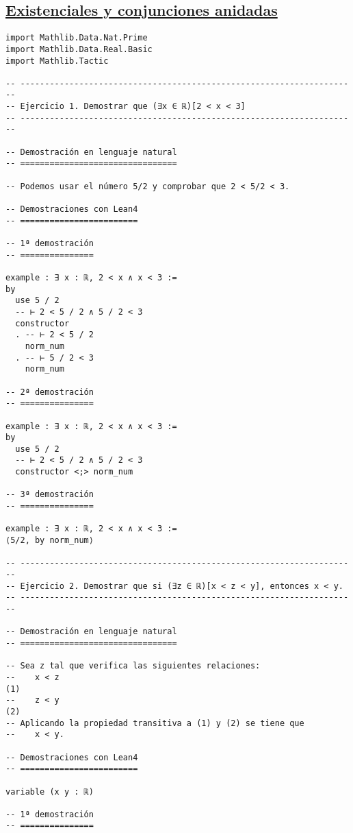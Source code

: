 \subsection{\href{./src/Logica/Existenciales\_y\_conjunciones\_anidadas.lean}{Existenciales y conjunciones anidadas}}
\label{sec:org947fbf4}
\begin{verbatim}
import Mathlib.Data.Nat.Prime
import Mathlib.Data.Real.Basic
import Mathlib.Tactic

-- ---------------------------------------------------------------------
-- Ejercicio 1. Demostrar que (∃x ∈ ℝ)[2 < x < 3]
-- ---------------------------------------------------------------------

-- Demostración en lenguaje natural
-- ================================

-- Podemos usar el número 5/2 y comprobar que 2 < 5/2 < 3.

-- Demostraciones con Lean4
-- ========================

-- 1ª demostración
-- ===============

example : ∃ x : ℝ, 2 < x ∧ x < 3 :=
by
  use 5 / 2
  -- ⊢ 2 < 5 / 2 ∧ 5 / 2 < 3
  constructor
  . -- ⊢ 2 < 5 / 2
    norm_num
  . -- ⊢ 5 / 2 < 3
    norm_num

-- 2ª demostración
-- ===============

example : ∃ x : ℝ, 2 < x ∧ x < 3 :=
by
  use 5 / 2
  -- ⊢ 2 < 5 / 2 ∧ 5 / 2 < 3
  constructor <;> norm_num

-- 3ª demostración
-- ===============

example : ∃ x : ℝ, 2 < x ∧ x < 3 :=
⟨5/2, by norm_num⟩

-- ---------------------------------------------------------------------
-- Ejercicio 2. Demostrar que si (∃z ∈ ℝ)[x < z < y], entonces x < y.
-- ---------------------------------------------------------------------

-- Demostración en lenguaje natural
-- ================================

-- Sea z tal que verifica las siguientes relaciones:
--    x < z                                                          (1)
--    z < y                                                          (2)
-- Aplicando la propiedad transitiva a (1) y (2) se tiene que
--    x < y.

-- Demostraciones con Lean4
-- ========================

variable (x y : ℝ)

-- 1ª demostración
-- ===============


\end{verbatim}

